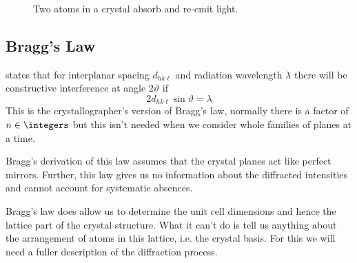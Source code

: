 \documentclass[fleqn]{NotesClass}
\begin{document}
\begin{figure}
        \caption[Diffraction mechanism]{Two atoms in a crystal absorb and re-emit light.}
    \end{figure}

    \subsection{Bragg's Law}
     states that for interplanar spacing \(d_{hk\ell}\) and radiation wavelength \(\lambda\) there will be constructive interference at angle \(2\vartheta\) if
    \begin{equation}
        2d_{hk\ell} \sin\vartheta = \lambda
    \end{equation}
    This is the crystallographer's version of Bragg's law, normally there is a factor of \(n \in \integers\) but this isn't needed when we consider whole families of planes at a time.
    
    Bragg's derivation of this law assumes that the crystal planes act like perfect mirrors.
    Further, this law gives us no information about the diffracted intensities and cannot account for systematic absences.
    
    Bragg's law does allow us to determine the unit cell dimensions and hence the lattice part of the crystal structure.
    What it can't do is tell us anything about the arrangement of atoms in this lattice, i.e. the crystal basis.
    For this we will need a fuller description of the diffraction process.
    
\end{document}
